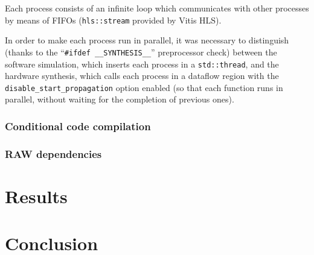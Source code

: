 \documentclass[11pt,a4paper]{memoir}
\begin{document}
Each process consists of an infinite loop which communicates with other
processes by means of FIFOs (\texttt{hls::stream} provided by Vitis HLS).

In order to make each process run in parallel, it was necessary to distinguish
(thanks to the ``\texttt{\#ifdef \_\_SYNTHESIS\_\_}'' preprocessor check)
between the software simulation, which inserts each process in a
\texttt{std::thread}, and the hardware synthesis, which calls each process in a
dataflow region with the \texttt{disable\_start\_propagation} option enabled
(so that each function runs in parallel, without waiting for the completion of
previous ones).

\subsection{Conditional code compilation}

\subsection{RAW dependencies}

\chapter{Results}
\chapter{Conclusion}
\end{document}
